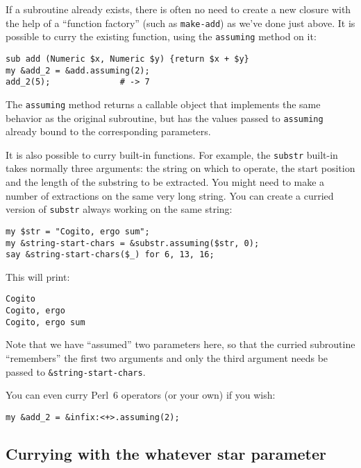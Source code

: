 If a subroutine already exists, there is often no need 
to create a new closure with the help of a ``function 
factory'' (such as {\tt make-add}) as we've done just above. 
It is possible to curry the existing function, using 
the {\tt assuming} method on it:

\begin{verbatim}
sub add (Numeric $x, Numeric $y) {return $x + $y}   
my &add_2 = &add.assuming(2);                       
add_2(5);              # -> 7                                     
\end{verbatim}

The {\tt assuming} method returns a callable object 
that implements the same behavior as the original 
subroutine, but has the values passed to {\tt assuming}
already bound to the corresponding parameters.

It is also possible to curry built-in functions. For example, 
the {\tt substr} built-in takes normally three arguments:
the string on which to operate, the start position and the 
length of the substring to be extracted. You might need 
to make a number of extractions on the same very long 
string. You can create a curried version of {\tt substr} 
always working on the same string:

\begin{verbatim}
my $str = "Cogito, ergo sum";                     
my &string-start-chars = &substr.assuming($str, 0);
say &string-start-chars($_) for 6, 13, 16; 
\end{verbatim}

This will print:

\begin{verbatim}
Cogito
Cogito, ergo
Cogito, ergo sum
\end{verbatim}

Note that we have ``assumed'' two parameters here, so 
that the curried subroutine ``remembers'' the first 
two arguments and only the third argument needs be 
passed to \verb'&string-start-chars'.

You can even curry Perl~6 operators (or your own) if 
you wish:

\begin{verbatim}
my &add_2 = &infix:<+>.assuming(2);
\end{verbatim}

\subsection{Currying with the whatever star parameter}
\label{whatever star parameter}

